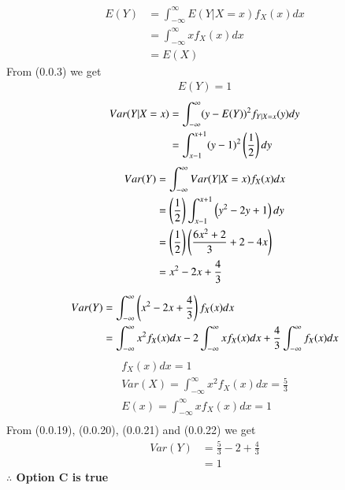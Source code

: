 \documentclass[journal,12pt,twocolumn]{IEEEtran}
\begin{document}
\begin{align}
    E(Y)&=\int_{-\infty}^{\infty}E(Y|X=x)f_{X}(x)dx\\
    &=\int_{-\infty}^{\infty}xf_{X}(x)dx\\
    &=E(X)
\end{align}
From (0.0.3) we get 
\begin{align}
    E(Y)=1
\end{align}
\begin{align}
    Var(Y|X=x)&=\int_{-\infty}^{\infty}(y-E(Y))^2f_{Y|X=x}(y)dy\\
    &=\int_{x-1}^{x+1}(y-1)^2\left(\frac{1}{2}\right)dy
\end{align}
\begin{align}
    Var(Y)&=\int_{-\infty}^{\infty}Var(Y|X=x)f_{X}(x)dx\\
    &=\left(\frac{1}{2}\right)\int_{x-1}^{x+1}\left(y^2-2y+1\right)dy\\
    &=\left(\frac{1}{2}\right)\left(\frac{6x^2+2}{3}+2-4x\right)\\
    &=x^2-2x+\frac{4}{3}
\end{align}

\begin{align}
    Var(Y)&=\int_{-\infty}^{\infty}\left(x^2-2x+\frac{4}{3}\right)f_{X}(x)dx\\
    &=\int_{-\infty}^{\infty}x^2f_{X}(x)dx-2\int_{-\infty}^{\infty}xf_{X}(x)dx+\frac{4}{3}\int_{-\infty}^{\infty}f_{X}(x)dx
\end{align}
\begin{align}
  f_{X}(x)dx=1\\
 Var(X)=\int_{-\infty}^{\infty}x^2f_{X}(x)dx=\frac{5}{3}\\
 E(x)=\int_{-\infty}^{\infty}xf_{X}(x)dx=1\\
 \end{align}
 From (0.0.19), (0.0.20), (0.0.21) and (0.0.22) we get
 \begin{align}
     Var(Y)&=\frac{5}{3}-2+\frac{4}{3}\\
     &=1
 \end{align}
\textbf{$\therefore$ Option C is true}
\end{document}
